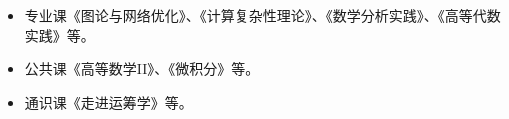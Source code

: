 %
%


\begin{itemize}[leftmargin=*]
	\item 专业课《图论与网络优化》、《计算复杂性理论》、《数学分析实践》、《高等代数实践》等。
	\item 公共课《高等数学II》、《微积分》等。
	\item 通识课《走进运筹学》等。
\end{itemize}
